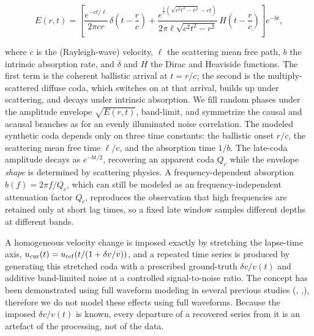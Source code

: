\documentclass[
  referee]{gji}
\providecommand{\dvv}{\ensuremath{\delta v/v}}
\begin{document}
\begin{linenomath*}
\begin{equation}
E(r,t)=\left[\frac{e^{-ct/\ell}}{2\pi c r}\,\delta\!\left(t-\frac{r}{c}\right) +
\frac{e^{\frac{1}{\ell}\left(\sqrt{c^2 t^2-r^2}-ct\right)}}{2\pi \ell\sqrt{c^2 t^2-r^2}}\,
H\!\left(t-\frac{r}{c}\right)\right] e^{-b t},
\label{eq:rt2d}
\end{equation}
\end{linenomath*}

where \(c\) is the (Rayleigh-wave) velocity, \(\ell\) the scattering
mean free path, \(b\) the intrinsic absorption rate, and \(\delta\) and
\(H\) the Dirac and Heaviside functions. The first term is the coherent
ballistic arrival at \(t=r/c\); the second is the multiply-scattered
diffuse coda, which switches on at that arrival, builds up under
scattering, and decays under intrinsic absorption. We fill random phases
under the amplitude envelope \(\sqrt{E(r,t)}\), band-limit, and
symmetrize the causal and acausal branches as for an evenly illuminated
noise correlation. The modeled synthetic coda depends only on three time
constants: the ballistic onset \(r/c\), the scattering mean free time
\(\ell/c\), and the absorption time \(1/b\). The late-coda amplitude
decays as \(e^{-b t/2}\), recovering an apparent coda \(Q_c\) while the
envelope \emph{shape} is determined by scattering physics. A
frequency-dependent absorption \(b(f)=2\pi f/Q_c\), which can still be
modeled as an frequency-independent attenuation factor \(Q_c\),
reproduces the observation that high frequencies are retained only at
short lag times, so a fixed late window samples different depths at
different bands.

A homogeneous velocity change is imposed exactly by stretching the
lapse-time axis,
\(u_{\rm cur}(t) = u_{\rm ref}\!\left(t/(1+\dvv)\right)\), and a
repeated time series is produced by generating this stretched coda with
a prescribed ground-truth \(\dvv(t)\) and additive band-limited noise at
a controlled signal-to-noise ratio. The concept has been demonstrated
using full waveform modeling in several previous studies
(\citet{Obermann2013}, \citet{Obermann2016},\citet{Yuan2021}), therefore
we do not model these effects using full waveforms. Because the imposed
\(\dvv(t)\) is known, every departure of a recovered series from it is
an artefact of the processing, not of the data.
\end{document}
